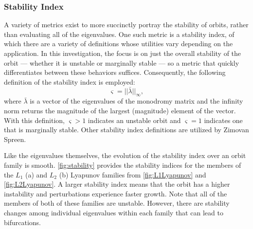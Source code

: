 \subsubsection{Stability Index}
A variety of metrics exist to more succinctly portray the stability of orbits, rather than
evaluating all of the eigenvalues. One such metric is a stability index, of which there are a
variety of definitions whose utilities vary depending on the application. In this investigation,
the focus is on just the overall stability of the orbit --- whether it is unstable or marginally
stable --- so a metric that quickly differentiates between these behaviors suffices. Consequently,
the following definition of the stability index is employed:
\begin{equation}
    \varsigma=||\bar{\lambda}||_{\infty},
    \label{eq:stabilityindex}
\end{equation}
where $\bar{\lambda}$ is a vector of the eigenvalues of the monodromy matrix and the infinity norm
returns the magnitude of the largest (magnitude) element of the vector\cite{Power:2019}. With this
definition, $\varsigma>1$ indicates an unstable orbit and $\varsigma=1$ indicates one that is
marginally stable. Other stability index definitions are utilized by Zimovan
Spreen\cite{ZimovanSpreen:2021}.

Like the eigenvalues themselves, the evolution of the stability index over an orbit family is
smooth. \cref{fig:stability} provides the stability indices for the members of the $L_{1}$ (a) and
$L_{2}$ (b) Lyapunov families from \cref{fig:L1Lyapunov} and \cref{fig:L2Lyapunov}. A larger
stability index means that the orbit has a higher instability and perturbations experience faster
growth. Note that all of the members of both of these families are unstable. However, there are
stability changes among individual eigenvalues within each family that can lead to bifurcations.

